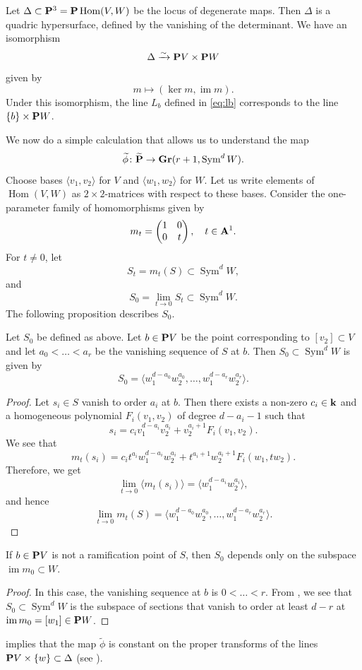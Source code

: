 \documentclass[11pt]{amsart}
\renewcommand {\P}{{\bf P}}
\providecommand {\Gr}{{\bf Gr}}
\providecommand {\A}{{\bf A}}
\providecommand{\Hom}{\operatorname{Hom}}
\providecommand{\Sym}{\operatorname{Sym}}
\providecommand{\im}{\operatorname{im}}
\begin{document}
Let \(\Delta \subset \P^3 = \P \Hom(V, W)\) be the locus of degenerate maps.
Then \(\Delta\) is a quadric hypersurface, defined by the vanishing of the determinant.
We have an isomorphism
\[\Delta \xrightarrow{\sim} \P V \times \P W\]
given by
\begin{equation}\label{eq:delta}
  m \mapsto (\ker m, \im m).
\end{equation}
Under this isomorphism, the line \(L_b\) defined in \eqref{eq:lb} corresponds to the line \(\{b\} \times \P W\).

We now do a simple calculation that allows us to understand the map
\[\widetilde \phi \colon \widetilde \P \to \Gr(r+1, \Sym^d W).\]
Choose bases \(\langle  v_1, v_2 \rangle\) for \(V\) and \(\langle w_1, w_2 \rangle\) for \(W\).
Let us write elements of \(\Hom(V, W)\) as \(2 \times 2\)-matrices with respect to these bases.
Consider the one-parameter family of homomorphisms given by
\begin{equation}\label{eq:mt}
  m_t = \begin{pmatrix} 1 & 0 \\ 0 & t \end{pmatrix}, \quad t \in \A^1.
\end{equation}
For \(t \neq 0\), let
\[S_t = m_t(S) \subset \Sym^d W,\]
and
\[
  S_0 = \lim_{t \to 0} S_t \subset \Sym^d W.
\]
The following proposition describes \(S_0\).
\begin{proposition}\label{prop:key}
  Let \(S_0\) be defined as above.
  Let \(b \in \P V\) be the point corresponding to \([v_2] \subset V\) and let \(a_0 < \dots <a_r\) be the vanishing sequence of \(S\) at \(b\).
  Then \(S_0 \subset \Sym^d W\) is given by
  \[ S_0 = \langle  w_1^{d-a_0}w_2^{a_0}, \dots, w_1^{d-a_r}w_2^{a_r}\rangle.\]
\end{proposition}
\begin{proof}
  Let \(s_i \in S\) vanish to order \(a_i\) at \(b\).
  Then there exists a non-zero \(c_i \in \mathbf k\) and a homogeneous polynomial \(F_i(v_1,v_2)\) of degree \(d-a_i-1\) such that
  \[ s_i = c_i v_1^{d-a_i}v_2^{a_i} + v_2^{a_i+1}F_i(v_1,v_2). \]
  We see that
  \[ m_t(s_i) = c_i t^{a_i}w_1^{d-a_i}w_2^{a_i} + t^{a_i+1}w_2^{a_i+1}F_i(w_1,tw_2). \]
  Therefore, we get
  \[ \lim_{t \to 0} \langle m_t(s_i) \rangle = \langle  w_1^{d-a_i}w_2^{a_i}\rangle,\]
  and hence
  \[ \lim_{t \to 0} m_t(S) = \langle  w_1^{d-a_0}w_2^{a_0}, \dots, w_1^{d-a_r}w_2^{a_r}\rangle.\]
\end{proof}
\begin{corollary}\label{cor:gen}
  If \(b \in \P V\) is not a ramification point of \(S\), then \(S_0\) depends only on the subspace \(\im m_0 \subset W\).
\end{corollary}
\begin{proof}
  In this case, the vanishing sequence at \(b\) is \(0 < \dots < r\).
  From , we see that \(S_0 \subset \Sym^d W\) is the subspace of sections that vanish to order at least \(d-r\) at \(\im m_0 = [w_1] \in \P W\).
\end{proof}
 implies that the map \(\widetilde \phi\) is constant on the proper transforms of the lines \(\P V \times \{w\} \subset \Delta\) (see ).
\end{document}
